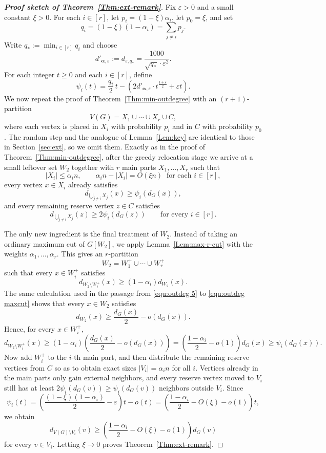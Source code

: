 \documentclass{aic}
\begin{document}
	\begin{proof}[\bf Proof sketch of Theorem~\ref{Thm:ext-remark}]
		Fix $\varepsilon>0$ and a small constant $\xi>0$.
		For each $i\in [r]$, let $p_i=(1-\xi)\alpha_i$, let $p_0=\xi$, and set
		\[q_i=(1-\xi)(1-\alpha_i)=\sum_{j\neq i} p_j.\]
		Write $q_*:=\min_{i\in [r]} q_i$ and choose
		$$d'_{\boldsymbol{\alpha},\varepsilon}:=d_{\varepsilon,q_*}=\frac{1000}{\sqrt{q_*}\cdot \varepsilon^2}.$$
		For each integer $t\ge 0$ and each $i\in [r]$, define
		\[
		\psi_i(t)=\frac{q_i}{2}\,t-\left(2d'_{\boldsymbol{\alpha},\varepsilon}\cdot t^{\frac{1+\varepsilon}{2}}+\varepsilon t\right).
		\]
		We now repeat the proof of Theorem~\ref{Thm:min-outdegree} with an $(r+1)$-partition
		\[V(G)=X_1\cup \cdots \cup X_r\cup C,\]
		where each vertex is placed in $X_i$ with probability $p_i$ and in $C$ with probability $p_0$.
		The random step and the analogue of Lemma~\ref{Lem:key} are identical to those in Section~\ref{sec:ext}, so we omit them.
		Exactly as in the proof of Theorem~\ref{Thm:min-outdegree}, after the greedy relocation stage we arrive at a small leftover set $W_2$ together with $r$ main parts $X_1,\ldots,X_r$ such that
		\[
		|X_i|\le \alpha_i n,\qquad \alpha_i n-|X_i|=O(\xi n)\ \text{ for each } i\in [r],
		\]
		every vertex $x\in X_i$ already satisfies
		\[d_{\bigcup_{j\neq i}X_j}(x)\ge \psi_i(d_G(x)),\]
		and every remaining reserve vertex $z\in C$ satisfies
		\[d_{\bigcup_{j\neq i}X_j}(z)\ge 2\psi_i(d_G(z))\qquad\text{for every } i\in [r].\]
		
		The only new ingredient is the final treatment of $W_2$.
		Instead of taking an ordinary maximum cut of $G[W_2]$, we apply Lemma~\ref{Lem:max-r-cut} with the weights $\alpha_1,\ldots,\alpha_r$.
		This gives an $r$-partition
		\[W_2=W_1^+\cup \cdots \cup W_r^+\]
		such that every $x\in W_i^+$ satisfies
		\[
		d_{W_2\setminus W_i^+}(x)\ge (1-\alpha_i)d_{W_2}(x).
		\]
		The same calculation used in the passage from \eqref{equ:outdeg 5} to \eqref{equ:outdeg maxcut} shows that every $x\in W_2$ satisfies
		\[
		d_{W_2}(x)\ge \frac{d_G(x)}{2}-o(d_G(x)).
		\]
		Hence, for every $x\in W_i^+$,
		\[
		d_{W_2\setminus W_i^+}(x)\ge (1-\alpha_i)\left(\frac{d_G(x)}{2}-o(d_G(x))\right)
		=\left(\frac{1-\alpha_i}{2}-o(1)\right)d_G(x)\ge \psi_i(d_G(x)).
		\]
		Now add $W_i^+$ to the $i$-th main part, and then distribute the remaining reserve vertices from $C$ so as to obtain exact sizes $|V_i|=\alpha_i n$ for all $i$.
		Vertices already in the main parts only gain external neighbors, and every reserve vertex moved to $V_i$ still has at least $2\psi_i(d_G(v))\ge \psi_i(d_G(v))$ neighbors outside $V_i$.
		Since
		\[
		\psi_i(t)=\left(\frac{(1-\xi)(1-\alpha_i)}{2}-\varepsilon\right)t-o(t)
		=\left(\frac{1-\alpha_i}{2}-O(\xi)-o(1)\right)t,
		\]
		we obtain
		\[
		d_{V(G)\setminus V_i}(v)\ge \left(\frac{1-\alpha_i}{2}-O(\xi)-o(1)\right)d_G(v)
		\]
		for every $v\in V_i$.
		Letting $\xi\to 0$ proves Theorem~\ref{Thm:ext-remark}.
	\end{proof}
\end{document}
